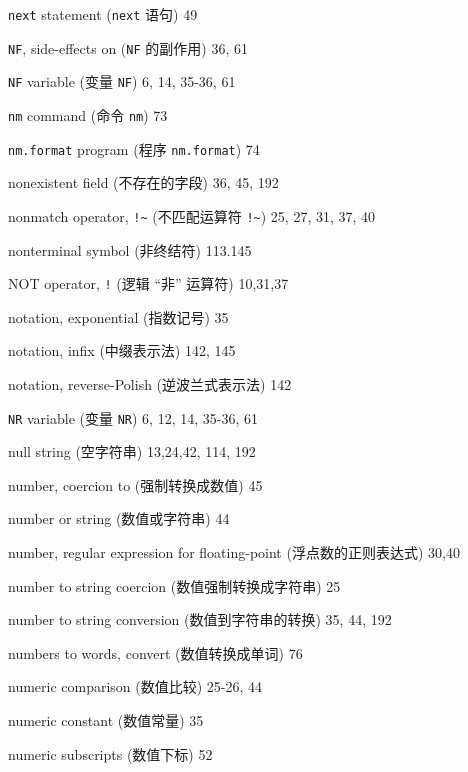 \begin{multicols}{2}
\hangindent=2pc  \verb'next' statement (\verb'next' 语句) 49

\hangindent=2pc  \verb'NF', side-effects on (\verb'NF'
的副作用) 36, 61

\hangindent=2pc  \verb'NF' variable (变量 \verb'NF') 6, 14, 35-36, 61

\hangindent=2pc  \verb'nm' command (命令 \verb'nm') 73

\hangindent=2pc  \verb'nm.format' program (程序
\verb'nm.format') 74


\hangindent=2pc  nonexistent field (不存在的字段) 36, 45, 192

\hangindent=2pc  nonmatch operator, \verb'!~' (不匹配运算符
\verb'!~') 25, 27, 31, 37, 40

\hangindent=2pc  nonterminal symbol (非终结符) 113.145

\hangindent=2pc  NOT operator, \verb'!' (逻辑 ``非'' 运算符)
10,31,37

\hangindent=2pc  notation, exponential (指数记号) 35

\hangindent=2pc  notation, infix (中缀表示法) 142, 145

\hangindent=2pc  notation, reverse-Polish (逆波兰式表示法) 142

\hangindent=2pc  \verb'NR' variable (变量 \verb'NR')
6, 12, 14, 35-36, 61

\hangindent=2pc  null string (空字符串) 13,24,42, 114, 192

\hangindent=2pc  number, coercion to (强制转换成数值) 45

\hangindent=2pc  number or string (数值或字符串) 44

\hangindent=2pc  number, regular expression for floating-point
(浮点数的正则表达式) 30,40

\hangindent=2pc  number to string coercion
(数值强制转换成字符串) 25

\hangindent=2pc  number to string conversion (数值到字符串的转换)
35,  44, 192

\hangindent=2pc  numbers to words, convert (数值转换成单词) 76

\hangindent=2pc  numeric comparison (数值比较) 25-26, 44

\hangindent=2pc  numeric constant (数值常量) 35

\hangindent=2pc  numeric subscripts (数值下标) 52


\end{multicols}
